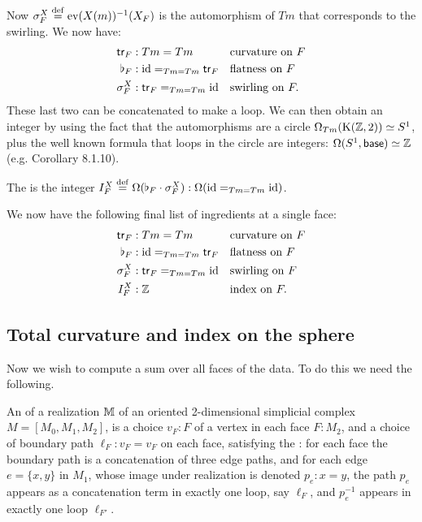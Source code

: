 Now \( \sigma^X_F\stackrel{\mathrm{def}}{=}\mathrm{ev}(X(m))^{-1}(X_F) \) is the automorphism of \( Tm \) that corresponds to the swirling. We now have:
\[\begin{aligned}
\mathsf{tr}_F&:Tm=Tm&&\text{curvature on }F\\
\flat_F&:\text{id}=_{Tm=Tm}\mathsf{tr}_F&&\text{flatness on }F\\
\sigma^X_F&:\mathsf{tr}_F=_{Tm=Tm}\text{id}&&\text{swirling on }F.\\
\end{aligned}\]
These last two can be concatenated to make a loop. We can then obtain an integer by using the fact that the automorphisms are a circle \( \Omega_{Tm}(\mathrm{K}(\mathbb{Z},2))\simeq S^1 \), plus the well known formula that loops in the circle are integers: \( \Omega(S^1,\mathsf{base})\simeq\mathbb{Z} \) (e.g. \cite{hottbook} Corollary 8.1.10).
\begin{mydef}
The  is the integer \( I^X_F\stackrel{\mathrm{def}}{=}\Omega(\flat_F\cdot \sigma^X_F):\Omega(\text{id}=_{Tm=Tm}\text{id}) \).
\end{mydef}
We now have the following final list of ingredients at a single face:
\begin{equation}
\label{eq:face_elements}
\begin{aligned}
\mathsf{tr}_F&:Tm=Tm&&\text{curvature on }F\\
\flat_F&:\text{id}=_{Tm=Tm}\mathsf{tr}_F&&\text{flatness on }F\\
\sigma^X_F&:\mathsf{tr}_F=_{Tm=Tm}\text{id}&&\text{swirling on }F\\
I^X_F&:\mathbb{Z}&&\text{index on }F.
\end{aligned}
\end{equation}

\subsection{Total curvature and index on the sphere}
Now we wish to compute a sum over all faces of the data. To do this we need the following.

\begin{mydef}
An  of a realization \( \mathbb{M} \) of an oriented 2-dimensional simplicial complex \( M=[M_0,M_1,M_2] \), is a choice \( v_F:F \) of a vertex in each face \( F:M_2 \), and a choice of boundary path \( \ell_F:v_F=v_F \) on each face, satisfying the : for each face the boundary path is a concatenation of three edge paths, and for each edge \( e=\{x,y\} \) in \( M_1 \), whose image under realization is denoted \( p_e:x=y \), the path \( p_e \) appears as a concatenation term in exactly one loop, say \( \ell_F \), and \( p_e^{-1} \) appears in exactly one loop \( \ell_{F'} \).
\end{mydef}


